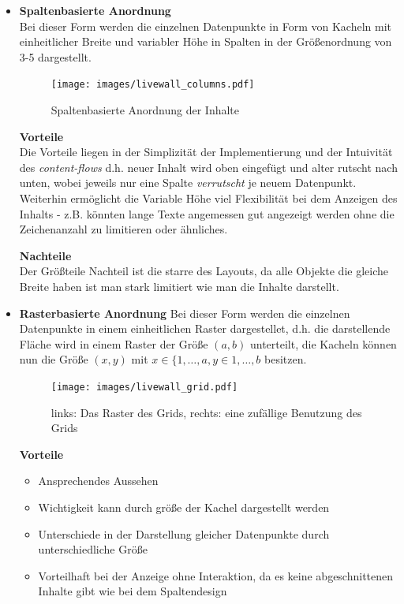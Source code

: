 \documentclass[12pt,twoside]{book}
\begin{document}
\begin{itemize}
  \item \textbf{Spaltenbasierte Anordnung} \\
  Bei dieser Form werden die einzelnen Datenpunkte in Form von Kacheln mit einheitlicher Breite und variabler Höhe in Spalten in der Größenordnung von 3-5 dargestellt.

  \begin{figure}[H]
    \centering
    \texttt{[image: images/livewall\_columns.pdf]}
    \caption{Spaltenbasierte Anordnung der Inhalte}
    \label{fig:awesome_image}
  \end{figure}

  \textbf{Vorteile} \\
  Die Vorteile liegen in der Simplizität der Implementierung und der Intuivität des \textit{content-flows} d.h. neuer Inhalt wird oben eingefügt und alter rutscht nach unten, wobei jeweils nur eine Spalte \textit{verrutscht} je neuem Datenpunkt.
  Weiterhin ermöglicht die Variable Höhe viel Flexibilität bei dem Anzeigen des Inhalts - z.B. könnten lange Texte angemessen gut angezeigt werden ohne die Zeichenanzahl zu limitieren oder ähnliches.

  \textbf{Nachteile}\\
  Der Größteile Nachteil ist die starre des Layouts, da alle Objekte die gleiche Breite haben ist man stark limitiert wie man die Inhalte darstellt.

  \item \textbf{Rasterbasierte Anordnung}
  Bei dieser Form werden die einzelnen Datenpunkte in einem einheitlichen Raster dargestellet, d.h. die darstellende Fläche wird in einem Raster der Größe $(a, b)$ unterteilt, die Kacheln können nun die Größe $(x, y)$ mit $ x \in \{1, \dots, a, y \in 1, \dots, b$ besitzen.

  \begin{figure}[H]
    \centering
    \texttt{[image: images/livewall\_grid.pdf]}
    \caption{links: Das Raster des Grids, rechts: eine zufällige Benutzung des Grids}
    \label{fig:awesome_image}
  \end{figure}

  \textbf{Vorteile} \\
  \begin{itemize}
    \item Ansprechendes Aussehen
    \item Wichtigkeit kann durch größe der Kachel dargestellt werden
    \item Unterschiede in der Darstellung gleicher Datenpunkte durch unterschiedliche Größe
    \item Vorteilhaft bei der Anzeige ohne Interaktion, da es keine abgeschnittenen Inhalte gibt wie bei dem Spaltendesign
  \end{itemize}


\end{itemize}
\end{document}
